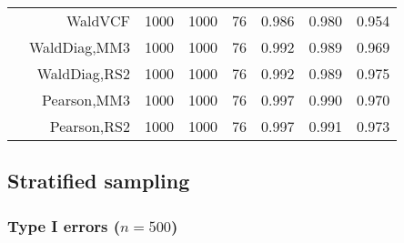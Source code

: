 \documentclass[
]{article}
\begin{document}
\begin{table}[H]
{\begin{tabular}[t]{lrrrrrrr}
\hspace{1em} & WaldVCF & 1000 & 1000 & 76 & 0.986 & 0.980 & 0.954\\

\hspace{1em} & WaldDiag,MM3 & 1000 & 1000 & 76 & 0.992 & 0.989 & 0.969\\

\hspace{1em} & WaldDiag,RS2 & 1000 & 1000 & 76 & 0.992 & 0.989 & 0.975\\

\hspace{1em} & Pearson,MM3 & 1000 & 1000 & 76 & 0.997 & 0.990 & 0.970\\

\hspace{1em} & Pearson,RS2 & 1000 & 1000 & 76 & 0.997 & 0.991 & 0.973\\
\bottomrule
\end{tabular}}
\endgroup{}
\end{table}

\hypertarget{stratified-sampling}{%
\subsection{Stratified sampling}\label{stratified-sampling}}

\hypertarget{type-i-errors-n500-1}{%
\subsubsection{\texorpdfstring{Type I errors
(\(n=500\))}{Type I errors (n=500)}}\label{type-i-errors-n500-1}}
\end{document}
